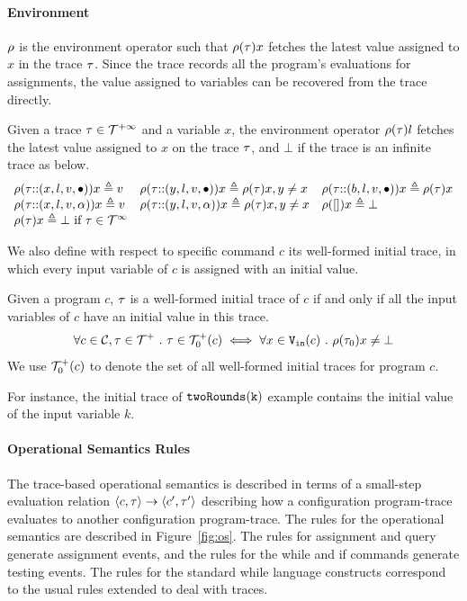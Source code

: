 % 
\paragraph{Environment}
 $\rho$ is the environment operator such that $\rho(\mathtt{\tau}) x$ fetches the latest value assigned to $x$ in the trace $\mathtt{\tau}$.
Since the trace records all the program's evaluations for assignments, 
the value assigned to variables can be recovered from the trace directly.
 \begin{defn}
 \label{def:adapt_env}
Given a trace $\mathtt{\tau} \in \mathcal{T}^{+\infty}$ and a variable $x$,
the environment operator $\rho(\mathtt{\tau}) l $ fetches the latest value assigned to $x$ on the trace $\mathtt{\tau}$,
and $\bot$ if the trace is an infinite trace as below.
\[
\begin{array}{lll}
\rho(\mathtt{\tau} {\small ::} (x, l, v, \bullet)) x \triangleq v
&
\rho(\mathtt{\tau} {\small ::} (y, l, v, \bullet)) x \triangleq \rho(\mathtt{\tau}) x, y \neq x
&
\rho(\mathtt{\tau} {\small ::} (b, l, v, \bullet)) x \triangleq \rho(\mathtt{\tau}) x
\\
\rho(\mathtt{\tau} {\small ::} (x, l, v, \alpha)) x \triangleq v
&
\rho(\mathtt{\tau} {\small ::} (y, l, v, \alpha)) x \triangleq \rho(\mathtt{\tau}) x, y \neq x
&
\rho({[]} ) x \triangleq \bot
\\
\rho(\mathtt{\tau} ) x \triangleq \bot ~ \text{if}~ \mathtt{\tau} \in \mathcal{T}^{\infty}
\end{array}
\]
\end{defn}
We also define with respect to specific command $c$ its well-formed initial trace, in which
every input variable of $c$ is assigned with an initial value.
\begin{defn}
 \label{def:adaptfun-initial_trace}
 Given a program $c$, $\mathtt{\tau}$ is a well-formed initial trace of $c$ if and only if all the input variables of $c$ have an initial value in this trace.
 \[
 \forall c \in \mathcal{C}, \mathtt{\tau} \in \mathcal{T}^{+} ~.~ \mathtt{\tau} \in \mathcal{T}^{+}_0(c) \iff 
 \forall x \in {\ensuremath{\mathtt{V_{\mathtt{in}}}}}(c) ~.~ \rho(\mathtt{\tau}_0) x \neq \bot
 \]
 We use $\mathcal{T}^{+}_0(c)$ to denote the set of all well-formed initial traces for program $c$.
 \end{defn}
 For instance, the initial trace of $\mathtt{twoRounds(k)}$ example contains the initial value of the input variable $k$.

 \paragraph{Operational Semantics Rules}
 The trace-based operational semantics is described in terms of a small-step evaluation relation
 $\langle c, \mathtt{\tau} \rangle \to \langle c', \mathtt{\tau}' \rangle$ describing how a configuration program-trace evaluates to another
 configuration program-trace. 
 The rules for the operational semantics are described in Figure~\ref{fig:os}.
 The rules for assignment and query generate assignment events, and the rules for the while and if commands generate testing events. 
 The rules for the standard while language constructs correspond to the usual rules extended to deal with traces. 

